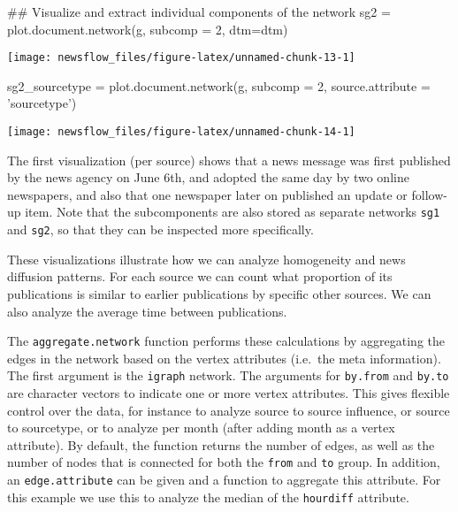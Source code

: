\begin{Schunk}
\begin{Sinput}
## Visualize and extract individual components of the network 
sg2 = plot.document.network(g, subcomp = 2, dtm=dtm)
\end{Sinput}

\texttt{[image: newsflow\_files/figure-latex/unnamed-chunk-13-1]} \end{Schunk}

\begin{Schunk}
\begin{Sinput}
sg2_sourcetype = plot.document.network(g, subcomp = 2, source.attribute = 'sourcetype')
\end{Sinput}

\texttt{[image: newsflow\_files/figure-latex/unnamed-chunk-14-1]} \end{Schunk}

The first visualization (per source) shows that a news message was first
published by the news agency on June 6th, and adopted the same day by
two online newspapers, and also that one newspaper later on published an
update or follow-up item. Note that the subcomponents are also stored as
separate networks \texttt{sg1} and \texttt{sg2}, so that they can be
inspected more specifically.

These visualizations illustrate how we can analyze homogeneity and news
diffusion patterns. For each source we can count what proportion of its
publications is similar to earlier publications by specific other
sources. We can also analyze the average time between publications.

The \texttt{aggregate.network} function performs these calculations by
aggregating the edges in the network based on the vertex attributes
(i.e.~the meta information). The first argument is the \texttt{igraph}
network. The arguments for \texttt{by.from} and \texttt{by.to} are
character vectors to indicate one or more vertex attributes. This gives
flexible control over the data, for instance to analyze source to source
influence, or source to sourcetype, or to analyze per month (after
adding month as a vertex attribute). By default, the function returns
the number of edges, as well as the number of nodes that is connected
for both the \texttt{from} and \texttt{to} group. In addition, an
\texttt{edge.attribute} can be given and a function to aggregate this
attribute. For this example we use this to analyze the median of the
\texttt{hourdiff} attribute.

